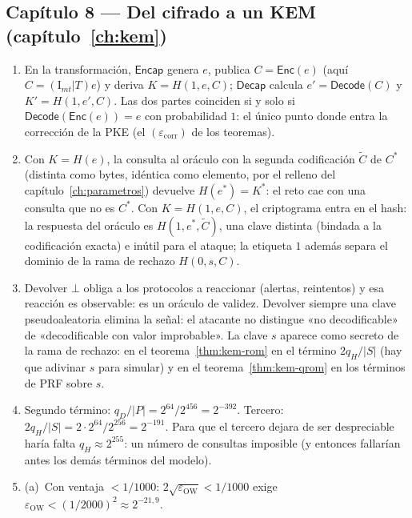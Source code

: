 \subsection*{Capítulo 8 --- Del cifrado a un KEM
(capítulo~\ref{ch:kem})}

\begin{enumerate}[leftmargin=1.9em,itemsep=4pt]
  \item En la transformación, $\textsf{Encap}$ genera $e$, publica
        $C=\textsf{Enc}(e)$ (aquí $C=(\mathrm{I}_{mt}|T)e$) y deriva
        $K=H(1,e,C)$; $\textsf{Decap}$ calcula $e'=\textsf{Decode}(C)$
        y $K'=H(1,e',C)$. Las dos partes coinciden si y solo si
        $\textsf{Decode}(\textsf{Enc}(e))=e$ con probabilidad $1$: el
        único punto donde entra la corrección de la PKE (el
        $(\varepsilon_{\mathrm{corr}})$ de los teoremas).
  \item Con $K=H(e)$, la consulta al oráculo con la segunda
        codificación $\tilde C$ de $C^*$ (distinta como bytes,
        idéntica como elemento, por el relleno del
        capítulo~\ref{ch:parametros}) devuelve $H(e^*)=K^*$: el reto
        cae con una consulta que no es $C^*$. Con $K=H(1,e,C)$, el
        criptograma entra en el hash: la respuesta del oráculo es
        $H(1,e^*,\tilde C)$, una clave distinta (bindada a la
        codificación exacta) e inútil para el ataque; la etiqueta
        $1$ además separa el dominio de la rama de rechazo
        $H(0,s,C)$.
  \item Devolver $\bot$ obliga a los protocolos a reaccionar
        (alertas, reintentos) y esa reacción es observable: es un
        oráculo de validez. Devolver siempre una clave
        pseudoaleatoria elimina la señal: el atacante no distingue
        «no decodificable» de «decodificable con valor improbable».
        La clave $s$ aparece como secreto de la rama de rechazo: en
        el teorema~\ref{thm:kem-rom} en el término $2q_H/|S|$ (hay
        que adivinar $s$ para simular) y en el
        teorema~\ref{thm:kem-qrom} en los términos de PRF sobre $s$.
  \item Segundo término: $q_D/|P|=2^{64}/2^{456}=2^{-392}$. Tercero:
        $2q_H/|S|=2\cdot2^{64}/2^{256}=2^{-191}$. Para que el tercero
        dejara de ser despreciable haría falta $q_H\approx2^{255}$:
        un número de consultas imposible (y entonces fallarían
        antes los demás términos del modelo).
  \item (a)~Con ventaja $<1/1000$: $2\sqrt{\varepsilon_{\mathrm{OW}}}
        <1/1000$ exige
        $\varepsilon_{\mathrm{OW}}<(1/2000)^2\approx2^{-21{,}9}$.

\end{enumerate}
